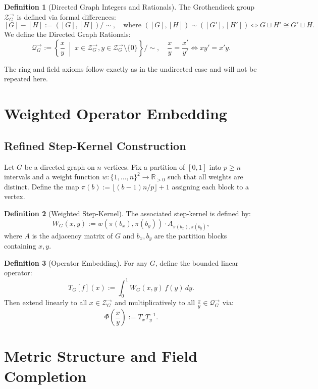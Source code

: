 \documentclass[11pt]{article}
\theoremstyle{definition}
\newtheorem{definition}{Definition}[section]
\theoremstyle{plain}
\theoremstyle{remark}
\begin{document}
\begin{definition}[Directed Graph Integers and Rationals]
The Grothendieck group \( \mathcal{Z}_G^\to \) is defined via formal differences:
\[
  [G] - [H] := ([G],[H]) / \sim, \quad \text{where } ([G],[H]) \sim ([G'],[H']) \iff G \sqcup H' \cong G' \sqcup H.
\]
We define the Directed Graph Rationals:
\[
  \mathcal{Q}_G^\to := \left\{ \frac{x}{y} \;\middle|\; x \in \mathcal{Z}_G^\to, y \in \mathcal{Z}_G^\to \setminus \{0\} \right\} / \sim,
\quad
\frac{x}{y} = \frac{x'}{y'} \iff x y' = x' y.
\]
\end{definition}

The ring and field axioms follow exactly as in the undirected case and will not be repeated here.

\section{Weighted Operator Embedding}

\subsection{Refined Step-Kernel Construction}

Let \( G \) be a directed graph on \( n \) vertices. Fix a partition of \([0,1]\) into \( p \ge n \) intervals and a weight function \( w: \{1,\dots,n\}^2 \to \mathbb{R}_{>0} \) such that all weights are distinct. Define the map \( \pi(b) := \lfloor (b-1)n/p \rfloor + 1 \) assigning each block to a vertex.

\begin{definition}[Weighted Step-Kernel]
The associated step-kernel is defined by:
\[
  W_G(x,y) := w(\pi(b_x), \pi(b_y)) \cdot A_{\pi(b_x),\pi(b_y)},
\]
where \( A \) is the adjacency matrix of \( G \) and \( b_x, b_y \) are the partition blocks containing \( x, y \).
\end{definition}

\begin{definition}[Operator Embedding]
For any \( G \), define the bounded linear operator:
\[
  T_G[f](x) := \int_0^1 W_G(x,y)\,f(y)\,dy.
\]
Then extend linearly to all \( x \in \mathcal{Z}_G^\to \) and multiplicatively to all \( \frac{x}{y} \in \mathcal{Q}_G^\to \) via:
\[
  \Phi\left( \frac{x}{y} \right) := T_x T_y^{-1}.
\]
\end{definition}

\section{Metric Structure and Field Completion}
\end{document}
